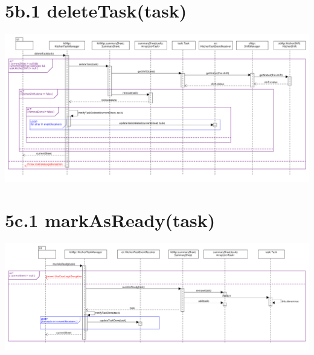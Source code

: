 \pagebreak

\section*{5b.1 deleteTask(task)}

\begin{center}
  \includegraphics[scale = 0.25]{images/DSD/DSD 5b.png}
\end{center}

\pagebreak\section*{5c.1 markAsReady(task)}

\begin{center}
  \includegraphics[scale = 0.27]{images/DSD/DSD 5c.png}
\end{center}

\pagebreak
